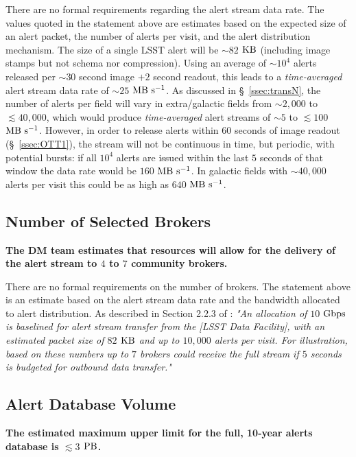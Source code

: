 \documentclass[DM,authoryear,toc]{lsstdoc}
\begin{document}
There are no formal requirements regarding the alert stream data rate. The values quoted in the statement above are estimates based on the expected size of an alert packet, the number of alerts per visit, and the alert distribution mechanism. The size of a single LSST alert will be $\sim82$ $\rm KB$ (including image stamps but not schema nor compression). Using an average of $\sim10^4$ alerts released per $\sim30$ second image $+2$ second readout, this leads to a {\it time-averaged} alert stream data rate of  $\sim25$ $\rm MB\ s^{-1}$. As discussed in \S~\ref{ssec:transN}, the number of alerts per field will vary in extra/galactic fields from $\sim2,000$ to $\lesssim40,000$, which would produce {\it time-averaged} alert streams of $\sim5$ to $\lesssim100$ $\rm MB\ s^{-1}$. However, in order to release alerts within $60$ seconds of image readout (\S~\ref{ssec:OTT1}), the stream will not be continuous in time, but periodic, with potential bursts: if all $10^4$ alerts are issued within the last $5$ seconds of that window the data rate would be $160$ $\rm MB\ s^{-1}$. In galactic fields with $\sim40,000$ alerts per visit this could be as high as $640$ $\rm MB\ s^{-1}$.


\subsection{Number of Selected Brokers}\label{ssec:num_brokers}

{\bf The DM team estimates that resources will allow for the delivery of the alert stream to $4$ to $7$ community brokers.}

There are no formal requirements on the number of brokers. The statement above is an estimate based on the alert stream data rate and the bandwidth allocated to alert distribution. As described in Section 2.2.3 of : {\it "An allocation of $10$ $\rm Gbps$ is baselined for alert stream transfer from the [LSST Data Facility], with an estimated packet size of $82$ $\rm KB$ and up to $10,000$ alerts per visit. For illustration, based on these numbers up to $7$ brokers could receive the full stream if $5$ seconds is budgeted for outbound data transfer."} 


\subsection{Alert Database Volume}\label{ssec:adb_volume}

{\bf The estimated maximum upper limit for the full, 10-year alerts database is $\lesssim3$ $\rm PB$.}
\end{document}
